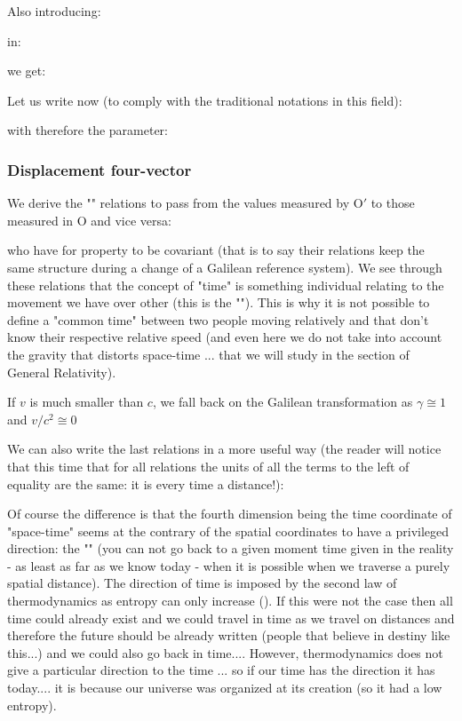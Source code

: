 	Also introducing:
	
	in:
	
	we get:
	
	Let us write now (to comply with the traditional notations in this field):
	
	with therefore the parameter:
	

	\subsubsection{Displacement four-vector}
	We derive the "" relations to pass from the values measured by $\text{O}'$ to those measured in $\text{O}$ and vice versa:
	
	who have for property to be covariant (that is to say their relations keep the same structure during a change of a Galilean reference system). We see through these relations that the concept of "time" is something individual relating to the movement we have over other (this is the ""). This is why it is not possible to define a "common time" between two people moving relatively and that don't know their respective relative speed (and even here we do not take into account the gravity that distorts space-time ... that we will study in the section of General Relativity).
	\begin{tcolorbox}[title=Remark,colframe=black,arc=10pt]
	If $v$ is much smaller than $c$, we fall back on the Galilean transformation as $\gamma\cong 1$ and $v/c^2\cong 0$
	\end{tcolorbox}
	We can also write the last relations in a more useful way (the reader will notice that this time that for all relations the units of all the terms to the left of equality are the same: it is every time a distance!):
	
	Of course the difference is that the fourth dimension being the time coordinate of "space-time" seems at the contrary of the spatial coordinates to have a privileged direction: the "" (you can not go back to a given moment time given in the reality - as least as far as we know today - when it is possible when we traverse a purely spatial distance). The direction of time is imposed by the second law of thermodynamics as entropy can only increase (). If this were not the case then all time could already exist and we could travel in time as we travel on distances and therefore the future should be already written (people that believe in destiny like this...) and we could also go back in time.... However, thermodynamics does not give a particular direction to the time ... so if our time has the direction it has today.... it is because our universe was organized at its creation (so it had a low entropy).
	
